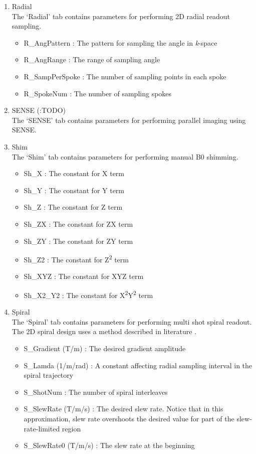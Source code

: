 \documentclass{book}%
\begin{document}
\begin{enumerate}
	\item Radial \\
	The `Radial' tab contains parameters for performing 2D radial readout sampling.
		\begin{itemize}
			\item R\_AngPattern : The pattern for sampling the angle in \textit{k}-space
			\item R\_AngRange : The range of sampling angle
			\item R\_SampPerSpoke : The number of sampling points in each spoke
			\item R\_SpokeNum : The number of sampling spokes
		\end{itemize}
	
  \item SENSE (:TODO) \\
	The `SENSE' tab contains parameters for performing parallel imaging using SENSE.
	
	\item Shim \\
	The `Shim' tab contains parameters for performing manual B0 shimming.
		\begin{itemize}
			\item Sh\_X : The constant for X term
			\item Sh\_Y : The constant for Y term
			\item Sh\_Z :  The constant for Z term
			\item Sh\_ZX : The constant for ZX term
			\item Sh\_ZY : The constant for ZY term
			\item Sh\_Z2 : The constant for Z\textsuperscript{2} term
			\item Sh\_XYZ : The constant for XYZ term
			\item Sh\_X2\_Y2 : The constant for X\textsuperscript{2}Y\textsuperscript{2} term
		\end{itemize}
	
	\item Spiral \\
	The `Spiral' tab contains parameters for performing multi shot spiral readout. The 2D spiral design uses a method described in literature \cite{Glover2005}.
		\begin{itemize}
			\item S\_Gradient (T/m) : The desired gradient amplitude
			\item S\_Lamda (1/m/rad) : A constant affecting radial sampling interval in the spiral trajectory
			\item S\_ShotNum : The number of spiral interleaves
			\item S\_SlewRate (T/m/s) : The desired slew rate. Notice that in this approximation, slew rate overshoots the desired value for part of the slew-rate-limited region
			\item S\_SlewRate0 (T/m/s) : The slew rate at the beginning
		\end{itemize}
	

\end{enumerate}
\end{document}
